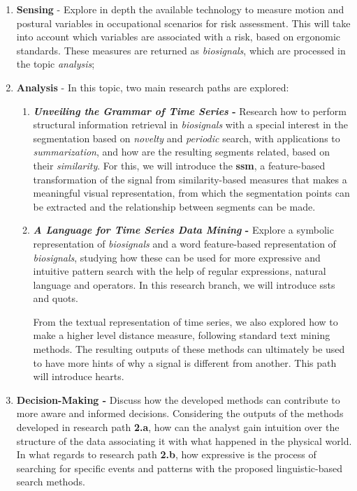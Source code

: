 \begin{enumerate}

\item \textbf{Sensing} - Explore in depth the available technology to measure motion and postural variables in occupational scenarios for risk assessment. This will take into account which variables are associated with a risk, based on ergonomic standards. These measures are returned as \textit{biosignals}, which are processed in the topic \textit{analysis};

\item \textbf{Analysis} - In this topic, two main research paths are explored: 
	\begin{enumerate}
		\item \textbf{\textit{Unveiling the Grammar of Time Series} -} Research how to perform structural information retrieval in \textit{biosignals} with a special interest in the segmentation based on \textit{novelty} and \textit{periodic} search, with applications to \textit{summarization}, and how are the resulting segments related, based on their \textit{similarity}. For this, we will introduce the \textbf{\gls{ssm}}, a feature-based transformation of the signal from similarity-based measures that makes a meaningful visual representation, from which the segmentation points can be extracted and the relationship between segments can be made. 
		\item \textbf{\textit{A Language for Time Series Data Mining} - } Explore a symbolic representation of \textit{biosignals} and a word feature-based representation of \textit{biosignals}, studying how these can be used for more expressive and intuitive pattern search with the help of regular expressions, natural language and operators. In this research branch, we will introduce \gls{ssts} and \gls{quots}. 
		
From the textual representation of time series, we also explored how to make a higher level distance measure, following standard text mining methods. The resulting outputs of these methods can ultimately be used to have more hints of why a signal is different from another. This path will introduce \gls{hearts}.

	\end{enumerate}

\item \textbf{Decision-Making -} Discuss how the developed methods can contribute to more aware and informed decisions. Considering the outputs of the methods developed in research path \textbf{2.a}, how can the analyst gain intuition over the structure of the data associating it with what happened in the physical world. In what regards to research path \textbf{2.b}, how expressive is the process of searching for specific events and patterns with the proposed linguistic-based search methods.

\end{enumerate}


